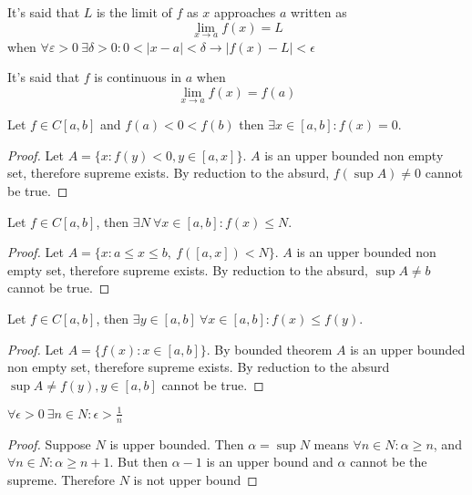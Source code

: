 \documentclass[../../main.tex]{subfiles}
\begin{document}
\begin{definition}[Limit]
    It's said that $L$ is the limit of $f$ as $x$ approaches $a$ written as
    $$
    \lim_{x\rightarrow a}f(x) = L
    $$
    when $\forall \varepsilon >0\ \exists\delta>0: 0<|x-a|<\delta \rightarrow |f(x) - L| < \epsilon
    $
\end{definition}
\begin{definition}[Continuity]
    It's said that $f$ is continuous in $a$ when
    $$
    \lim_{x\rightarrow a} f(x) = f(a)
    $$
\end{definition}
\begin{theorem}
    Let $f\in C[a,b]$ and $f(a) < 0 < f(b)$ then $\exists x\in [a,b]: f(x)=0$.
\end{theorem}
\begin{proof}
    Let $A = \{ x : f(y) < 0, y \in [a, x] \}$. $A$ is an upper bounded non empty set, therefore supreme exists. By reduction to the absurd, $f(\sup A) \neq 0$ cannot be true.
\end{proof}
\begin{theorem}
    Let $f\in C[a,b]$, then $\exists N \ \forall x\in[a,b]: f(x)\leq N$.
\end{theorem}
\begin{proof}
    Let $A = \{ x : a\le x\le b, \  f([a, x])<N\}$. $A$ is an upper bounded non empty set, therefore supreme exists. By reduction to the absurd, $\sup A \neq b$ cannot be true.
\end{proof}
\begin{theorem}
    Let $f\in C[a,b]$, then $\exists y\in [a,b] \ \forall x\in [a,b]: f(x) \leq f(y)$.
\end{theorem}
\begin{proof}
    Let $A = \{ f(x) : x\in [a,b] \}$. By bounded theorem $A$ is an upper bounded non empty set, therefore supreme exists. By reduction to the absurd $\sup A \neq f(y), y\in [a,b]$ cannot be true.
\end{proof}
\begin{theorem}
    $\forall \epsilon > 0 \ \exists n\in N: \epsilon > \frac{1}{n}$
\end{theorem}
\begin{proof}
    Suppose $N$ is upper bounded. Then $\alpha = \sup N$ means $\forall n\in N: \alpha \ge n$, and $\forall n\in N: \alpha \ge n+1$. But then $\alpha - 1$ is an upper bound and $\alpha$ cannot be the supreme. Therefore $N$ is not upper bound
\end{proof}
\end{document}
